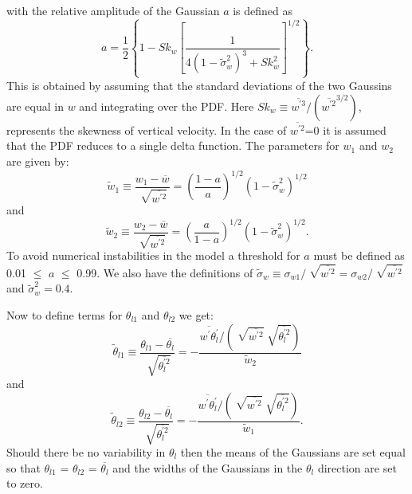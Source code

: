 \documentclass[12pt,titlepage]{article}
\numberwithin{equation}{section}
\begin{document}
%
with the relative amplitude of the Gaussian $a$ is defined as
%
\begin{equation}
  a=\frac{1}{2}\left\{1-Sk_{w}\left[\frac{1}{4(1-\tilde{\sigma}_{w}^{2})^{3}+Sk_{w}^{2}}\right]^{1/2}\right\}.
  \label{adg_a}
\end{equation}
%
This is obtained by assuming that the standard deviations of the two Gaussins are equal in $w$ and integrating over the PDF.  Here $Sk_{w}\equiv \overline{w^{'3}}/(\overline{w^{'2}}^{3/2})$, represents the skewness of vertical velocity.  In the case of $\overline{w^{'2}}$=0 it is assumed that the PDF reduces to a single delta function.  The parameters for $w_{1}$ and $w_{2}$ are given by:
%
\begin{equation}
  \tilde{w}_{1}\equiv\frac{w_{1}-\overline{w}}{\sqrt[]{\overline{w^{'2}}}}=\left(\frac{1-a}{a}\right)^{1/2}(1-\tilde{\sigma}_{w}^{2})^{1/2}
  \label{tildew_1}
\end{equation}
%
and
%
\begin{equation}
  \tilde{w}_{2}\equiv\frac{w_{2}-\overline{w}}{\sqrt[]{\overline{w^{'2}}}}=\left(\frac{a}{1-a}\right)^{1/2}(1-\tilde{\sigma}_{w}^{2})^{1/2} . 
  \label{tildew_2}
\end{equation}
%
To avoid numerical instabilities in the model a threshold for $a$ must be defined as 0.01 $\le$ $a$ $\le$ 0.99.  We also have the definitions of $\tilde{\sigma}_{w}\equiv\sigma_{w1}/ \sqrt[]{\overline{w^{'2}}} = \sigma_{w2}/\sqrt[]{\overline{w^{'2}}}$ and $\tilde{\sigma}_{w}^{2}=0.4$.  

Now to define terms for $\theta_{l1}$ and $\theta_{l2}$ we get:
%
\begin{equation}
  \tilde{\theta}_{l1}\equiv\frac{\theta_{l1}-\overline{\theta_{l}}}{\sqrt[]{\overline{\theta_{l}^{'2}}}}=-\frac{\overline{w^{'}\theta_{l}^{'}}/(\sqrt[]{\overline{w^{'2}}}\sqrt[]{\overline{\theta_{l}^{'2}}})}{\tilde{w}_{2}}
  \label{tildethl_1}
\end{equation}
%
and
%
\begin{equation}
  \tilde{\theta}_{l2}\equiv\frac{\theta_{l2}-\overline{\theta_{l}}}{\sqrt[]{\overline{\theta_{l}^{'2}}}}=-\frac{\overline{w^{'}\theta_{l}^{'}}/(\sqrt[]{\overline{w^{'2}}}\sqrt[]{\overline{\theta_{l}^{'2}}})}{\tilde{w}_{1}} .  
  \label{tildethl_2}
\end{equation}
%
Should there be no variability in $\theta_{l}$ then the means of the Gaussians are set equal so that $\theta_{l1}$ = $\theta_{l2}$ = $\overline{\theta_{l}}$ and the widths of the Gaussians in the $\theta_{l}$ direction are set to zero.  
\end{document}
